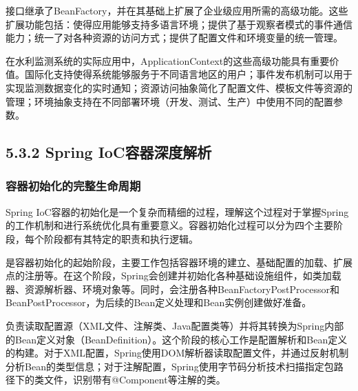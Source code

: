 接口继承了BeanFactory，并在其基础上扩展了企业级应用所需的高级功能。这些扩展功能包括：使得应用能够支持多语言环境；提供了基于观察者模式的事件通信能力；统一了对各种资源的访问方式；提供了配置文件和环境变量的统一管理。

在水利监测系统的实际应用中，ApplicationContext的这些高级功能具有重要价值。国际化支持使得系统能够服务于不同语言地区的用户；事件发布机制可以用于实现监测数据变化的实时通知；资源访问抽象简化了配置文件、模板文件等资源的管理；环境抽象支持在不同部署环境（开发、测试、生产）中使用不同的配置参数。

\hypertarget{spring-iocux5bb9ux5668ux6df1ux5ea6ux89e3ux6790}{%
\subsection{5.3.2 Spring IoC容器深度解析}\label{spring-iocux5bb9ux5668ux6df1ux5ea6ux89e3ux6790}}

\hypertarget{ux5bb9ux5668ux521dux59cbux5316ux7684ux5b8cux6574ux751fux547dux5468ux671f}{%
\subsubsection{容器初始化的完整生命周期}\label{ux5bb9ux5668ux521dux59cbux5316ux7684ux5b8cux6574ux751fux547dux5468ux671f}}

Spring IoC容器的初始化是一个复杂而精细的过程，理解这个过程对于掌握Spring的工作机制和进行系统优化具有重要意义。容器初始化过程可以分为四个主要阶段，每个阶段都有其特定的职责和执行逻辑。

是容器初始化的起始阶段，主要工作包括容器环境的建立、基础配置的加载、扩展点的注册等。在这个阶段，Spring会创建并初始化各种基础设施组件，如类加载器、资源解析器、环境对象等。同时，会注册各种BeanFactoryPostProcessor和BeanPostProcessor，为后续的Bean定义处理和Bean实例创建做好准备。

负责读取配置源（XML文件、注解类、Java配置类等）并将其转换为Spring内部的Bean定义对象（BeanDefinition）。这个阶段的核心工作是配置解析和Bean定义的构建。对于XML配置，Spring使用DOM解析器读取配置文件，并通过反射机制分析Bean的类型信息；对于注解配置，Spring使用字节码分析技术扫描指定包路径下的类文件，识别带有@Component等注解的类。

